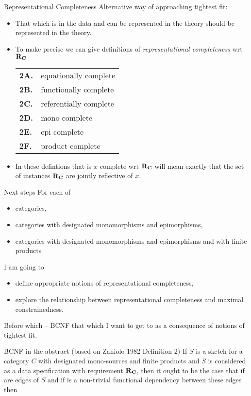 \begin{frame}{Representational Completeness}
Alternative way of approaching tightest fit:
\begin{itemize}
\item That which is in the data and can be represented in the theory should be represented in the theory.
\item To make precise we can give definitions
 of \textit{representational completeness} wrt $\textbf{R}_{\textbf{C}}$ 
\begin{center}
\begin{tabular}{>{\bfseries}l l} 
2A. & equationally complete   \\
2B. & functionally complete   \\
2C. & referentially complete  \\
2D. & mono complete           \\
2E. & epi complete            \\
2F. & product complete        \\
\end{tabular}
\end{center}
\pause \item In these defintions that \catcw is $x$ complete wrt $\textbf{R}_{\textbf{C}}$ will mean exactly that the set of instances $\textbf{R}_{\textbf{C}}$ are jointly reflective of $x$.
\end{itemize}
\end{frame}

\begin{frame}{Next steps}
For each of
\begin{itemize}
\item categories,
\item categories with designated monomorphisms and epimorphisms,
\item categories with designated monomorphisms and epimorphisms and with finite products
\end{itemize}
\medskip
I am going to
\begin{itemize}
\item define appropriate notions of representational completeness,
\item explore the relationship between representational completeness and maximal constrainedness.
\end{itemize}
{\large Before which -- BCNF that which I want to get to as a consequence of notions of tightest fit.}
\end{frame}


\begin{frame}{BCNF in the abstract (based on Zaniolo 1982 Definition 2)}
If $S$ is a sketch for a category $C$ with designated mono-sources  and finite products
and $S$ is considered as a data specification with requirement $\textbf{R}_{\textbf{C}}$, then it ought to be the case
that if 
are edges of $S$
and if   is a non-trivial functional dependency  between these edges
then 
\end{frame}

